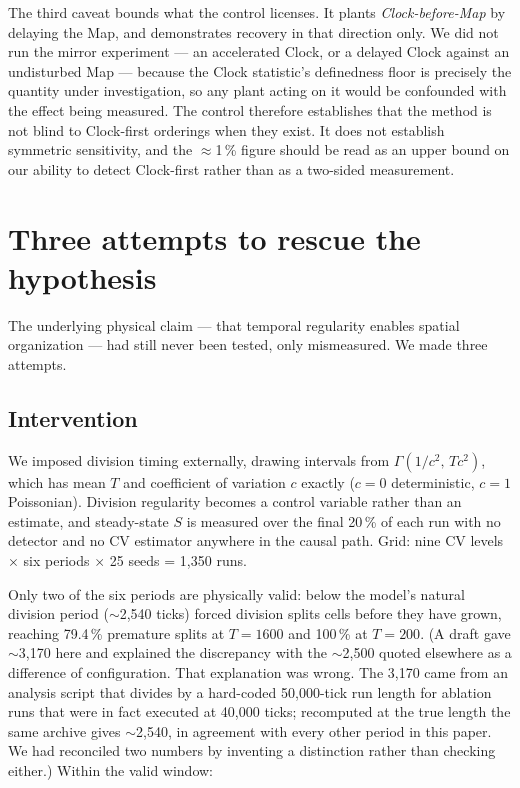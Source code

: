 \documentclass[11pt,letterpaper]{article}
\begin{document}
The third caveat bounds what the control licenses. It plants
\emph{Clock-before-Map} by delaying the Map, and demonstrates recovery
in that direction only. We did not run the mirror experiment --- an
accelerated Clock, or a delayed Clock against an undisturbed Map ---
because the Clock statistic's definedness floor is precisely the
quantity under investigation, so any plant acting on it would be
confounded with the effect being measured. The control therefore
establishes that the method is not blind to Clock-first orderings when
they exist. It does not establish symmetric sensitivity, and the
$\approx$1\,\% figure should be read as an upper bound on our ability to
detect Clock-first rather than as a two-sided measurement.

\section{Three attempts to rescue the hypothesis}
\label{sec:rescue}

The underlying physical claim --- that temporal regularity enables
spatial organization --- had still never been tested, only mismeasured.
We made three attempts.

\subsection{Intervention}

We imposed division timing externally, drawing intervals from
$\Gamma(1/c^2,\, T c^2)$, which has mean $T$ and coefficient of variation
$c$ exactly ($c = 0$ deterministic, $c = 1$ Poissonian). Division
regularity becomes a control variable rather than an estimate, and
steady-state $S$ is measured over the final 20\,\% of each run with no
detector and no CV estimator anywhere in the causal path. Grid: nine
CV levels $\times$ six periods $\times$ 25 seeds = 1{,}350 runs.

Only two of the six periods are physically valid: below the model's
natural division period ($\sim$2{,}540 ticks) forced division splits
cells before they have grown, reaching 79.4\,\% premature splits at
$T = 1600$ and 100\,\% at $T = 200$. (A draft gave $\sim$3{,}170 here
and explained the discrepancy with the $\sim$2{,}500 quoted elsewhere
as a difference of configuration. That explanation was wrong. The 3{,}170
came from an analysis script that divides by a hard-coded 50{,}000-tick
run length for ablation runs that were in fact executed at 40{,}000
ticks; recomputed at the true length the same archive gives
$\sim$2{,}540, in agreement with every other period in this paper. We
had reconciled two numbers by inventing a distinction rather than
checking either.) Within the valid window:
\end{document}
